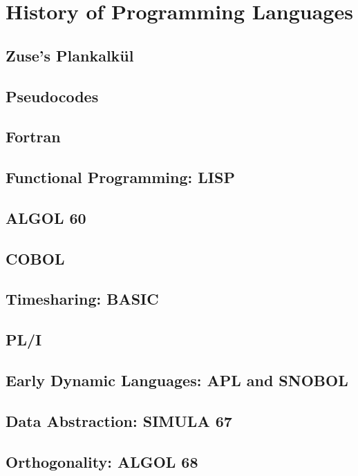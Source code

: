 \section{History of Programming Languages}\label{sec:Programming_Language_History}
\subsection{Zuse's Plankalk\"{u}l}\label{subsec:Zuses_Plankalkul}
\subsection{Pseudocodes}\label{subsec:Pseudocodes}
\subsection{Fortran}\label{subsec:Fortran}
\subsection{Functional Programming: LISP}\label{subsec:Functional_Programming-LISP}
\subsection{ALGOL 60}\label{subsec:ALGOL_60}
\subsection{COBOL}\label{subsec:COBOL}
\subsection{Timesharing: BASIC}\label{subsec:BASIC}
\subsection{PL/I}\label{subsec:PLI}
\subsection{Early Dynamic Languages: APL and SNOBOL}\label{subsec:Dynamic_Languages-APL_and_SNOBOL}
\subsection{Data Abstraction: SIMULA 67}\label{subsec:SIMULA_67}
\subsection{Orthogonality: ALGOL 68}\label{subsec:ALGOL_68}
